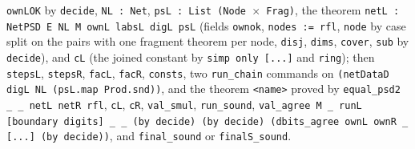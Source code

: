 \begin{algorithm}
\begin{enumerate}
  \textnormal{\texttt{ownLOK}} by \textnormal{\texttt{decide}}, \textnormal{\texttt{NL : Net}}, \textnormal{\texttt{psL : List (\allowbreak{}Node \ensuremath{\times} Frag)}}, the theorem
  \textnormal{\texttt{netL : NetPSD E NL M ownL labsL digL psL}} (fields \textnormal{\texttt{ownok}}, \textnormal{\texttt{nodes := rfl}},
  \textnormal{\texttt{node}} by case split on the pairs with one fragment theorem per node, \textnormal{\texttt{disj}},
  \textnormal{\texttt{dims}}, \textnormal{\texttt{cover}}, \textnormal{\texttt{sub}} by \textnormal{\texttt{decide}}), and \textnormal{\texttt{cL}} (the joined constant by
  \textnormal{\texttt{simp only [.\allowbreak{}.\allowbreak{}.\allowbreak{}]}} and \textnormal{\texttt{ring}}); then \textnormal{\texttt{stepsL}}, \textnormal{\texttt{stepsR}}, \textnormal{\texttt{facL}},
  \textnormal{\texttt{facR}}, \textnormal{\texttt{consts}}, two \textnormal{\texttt{run\_\allowbreak{}chain}} commands on
  \textnormal{\texttt{(\allowbreak{}netDataD digL NL (\allowbreak{}psL.\allowbreak{}map Prod.\allowbreak{}snd))}}, and the theorem \textnormal{\texttt{<name>}} proved by
  \textnormal{\texttt{equal\_\allowbreak{}psd2 \_\allowbreak{} \_\allowbreak{} netL netR rfl}}, \textnormal{\texttt{cL}}, \textnormal{\texttt{cR}}, \textnormal{\texttt{val\_\allowbreak{}smul}}, \textnormal{\texttt{run\_\allowbreak{}sound}},
  \textnormal{\texttt{val\_\allowbreak{}agree M \_\allowbreak{} runL [boundary digits] \_\allowbreak{} \_\allowbreak{} (\allowbreak{}by decide) (\allowbreak{}by decide) (\allowbreak{}dbits\_\allowbreak{}agree ownL ownR \_\allowbreak{} [.\allowbreak{}.\allowbreak{}.\allowbreak{}] (\allowbreak{}by decide))}},
  and \textnormal{\texttt{final\_\allowbreak{}sound}} or \textnormal{\texttt{finalS\_\allowbreak{}sound}}.
\end{enumerate}
\end{algorithm}

